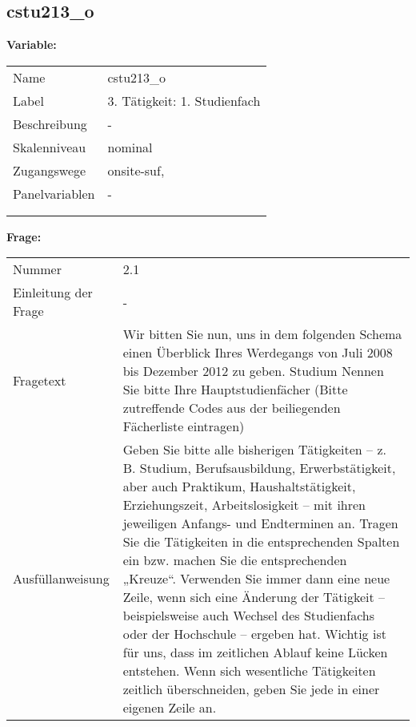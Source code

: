 	
	
	\subsection{cstu213\_o}
	\label{subSection:cstu213_o}

	\noindent\textbf{Variable:}\\
		\begin{tabular}{lL{11.3cm}}
			\label{tableVariable:cstu213_o}
			Name & cstu213\_o \\
			Label & 3. Tätigkeit: 1. Studienfach \\
			Beschreibung & - \\
			Skalenniveau & nominal \\
			Zugangswege &
				onsite-suf,
 \\
			Panelvariablen & -
			 \\
			 \\
 \\
		\end{tabular}

		\vspace*{1 cm}
		\noindent\textbf{Frage:}\\
		\begin{tabular}{lL{11.3cm}}
			\label{tableQuestion:cstu213_o}
			Nummer & 2.1 \\
			Einleitung der Frage & - \\
			Fragetext & Wir bitten Sie nun, uns in dem folgenden Schema einen Überblick Ihres Werdegangs von Juli 2008 bis Dezember 2012 zu geben.
Studium
Nennen Sie bitte Ihre Hauptstudienfächer
(Bitte zutreffende Codes aus der beiliegenden Fächerliste eintragen) \\
			Ausfüllanweisung & Geben Sie bitte alle bisherigen Tätigkeiten – z. B. Studium, Berufsausbildung, Erwerbstätigkeit, aber auch Praktikum, Haushaltstätigkeit,
Erziehungszeit, Arbeitslosigkeit – mit ihren jeweiligen Anfangs- und Endterminen an. Tragen Sie die Tätigkeiten in die entsprechenden Spalten ein bzw. machen Sie die entsprechenden „Kreuze“. Verwenden Sie immer dann eine neue Zeile, wenn sich eine Änderung der Tätigkeit – beispielsweise auch Wechsel des Studienfachs oder der Hochschule – ergeben hat. Wichtig ist für uns, dass im zeitlichen Ablauf keine Lücken entstehen. Wenn sich wesentliche Tätigkeiten zeitlich überschneiden, geben Sie jede in einer eigenen Zeile an. \\
		\end{tabular}





